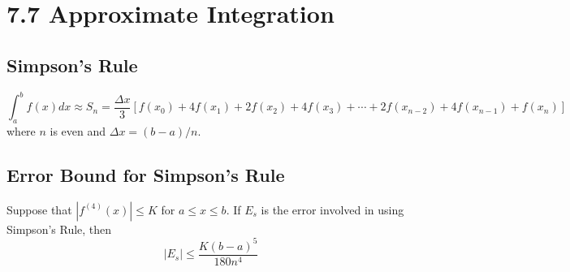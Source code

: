 %
%

\section*{7.7 Approximate Integration}

\subsection*{Simpson's Rule}

\[ \int_a^b{f(x)dx} \approx S_n = \frac{\Delta x}{3}[f(x_0) + 4f(x_1) + 2f(x_2) + 4f(x_3) + \cdots + 2f(x_{n-2}) + 4f(x_{n-1}) + f(x_n)] \]
where \(n\) is even and \(\Delta x = (b-a)/n \).

\subsection*{Error Bound for Simpson's Rule}

Suppose that \(|f^{(4)}(x)| \leq K \) for \(a \leq x \leq b\). If \(E_s\) is the error involved in using Simpson's Rule, then 
\[ |E_s| \leq \frac{K(b-a)^5}{180n^4} \]
